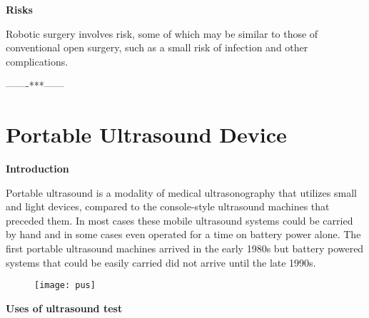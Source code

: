 \documentclass[12pt]{article}
\begin{document}
\LARGE\flushleft\textbf{Risks}

\large\flushleft Robotic surgery involves risk, some of which may be similar to those of conventional open surgery, such as a small risk of infection and other complications.\\
\vspace{1.5cm}

\centering\huge-------***------
\pagebreak
\section{\centering\Huge\textbf{Portable Ultrasound Device}}

\LARGE\flushleft\textbf{Introduction}

\large\flushleft Portable ultrasound is a modality of medical ultrasonography that utilizes small and light devices, compared to the console-style ultrasound machines that preceded them. In most cases these mobile ultrasound systems could be carried by hand and in some cases even operated for a time on battery power alone. The first portable ultrasound machines arrived in the early 1980s but battery powered systems that could be easily carried did not arrive until the late 1990s.

\vspace{1cm}

\begin{figure}[h]
\centering
\texttt{[image: pus]}
\end{figure}

 \pagebreak
\LARGE\flushleft\textbf{Uses of ultrasound test}
\end{document}

